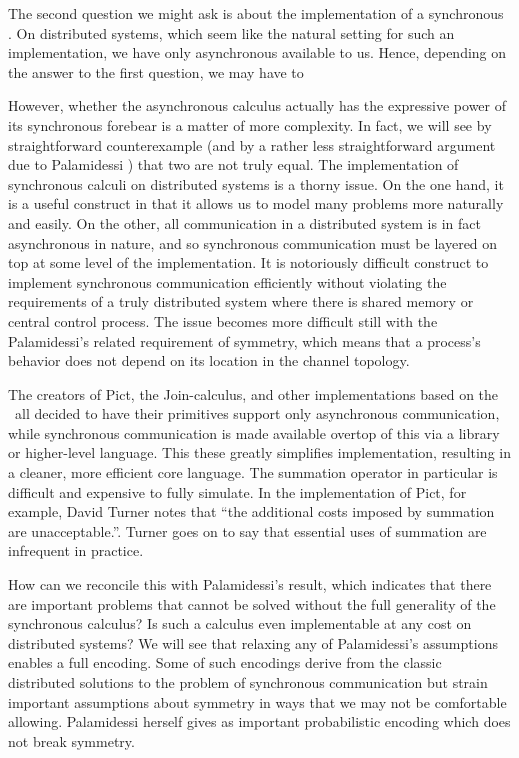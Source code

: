 The second question we might ask is about the implementation of a synchronous \picalc.  On distributed systems, which seem like the natural setting for such an implementation, we have only asynchronous available to us.  Hence, depending on the answer to the first question, we may have to 

However, whether the asynchronous calculus actually has the expressive power of its synchronous forebear is a matter of more complexity.  In fact, we will see by straightforward counterexample (and by a rather less straightforward argument due to Palamidessi \cite{palam03}) that two are not truly equal.
The implementation of synchronous calculi on distributed systems is a thorny issue.  On the one hand, it is a useful construct in that it allows us to model many problems more naturally and easily.  On the other, all communication in a distributed system is in fact asynchronous in nature, and so synchronous communication must be layered on top at some level of the implementation.  It is notoriously difficult construct to implement synchronous communication efficiently without violating the requirements of a truly distributed system where there is shared memory or central control process.  The issue becomes more difficult still with the Palamidessi's related requirement of symmetry, which means that a process's behavior does not depend on its location in the channel topology. 

The creators of Pict, the Join-calculus, and other implementations based on the \picalc\ all decided to have their primitives support only asynchronous communication, while synchronous communication is made available overtop of this via a library or higher-level language.  This these greatly simplifies implementation, resulting in a cleaner, more efficient core language.  The summation operator in particular is difficult and expensive to fully simulate.  In the implementation of Pict, for example, David Turner notes \cite{turner96} that ``the additional costs imposed by summation are unacceptable.''.  Turner goes on to say that essential uses of summation are infrequent in practice.

How can we reconcile this with Palamidessi's result, which indicates that there are important problems that cannot be solved without the full generality of the synchronous calculus?  Is such a calculus even implementable at any cost on distributed systems?  We will see that relaxing any of Palamidessi's assumptions enables a full encoding.  Some of such encodings derive from the classic distributed solutions to the problem of synchronous communication but strain important assumptions about symmetry in ways that we may not be comfortable allowing.  Palamidessi herself gives as important probabilistic encoding \cite{palam01} which does not break symmetry.

